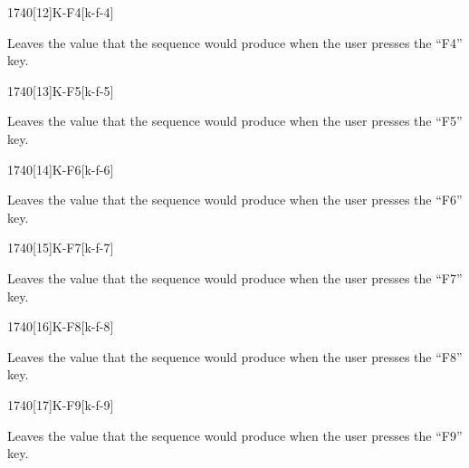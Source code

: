 \begin{worddef}{1740}[12]{K-F4}[k-f-4]%
\item {}

	Leaves the value  that the sequence 
	 would produce when the user presses the
	``F4'' key.

\end{worddef}


\begin{worddef}{1740}[13]{K-F5}[k-f-5]%
\item {}

	Leaves the value  that the sequence 
	 would produce when the user presses the
	``F5'' key.

\end{worddef}


\begin{worddef}{1740}[14]{K-F6}[k-f-6]%
\item {}

	Leaves the value  that the sequence 
	 would produce when the user presses the
	``F6'' key.

\end{worddef}


\begin{worddef}{1740}[15]{K-F7}[k-f-7]%
\item {}

	Leaves the value  that the sequence 
	 would produce when the user presses the
	``F7'' key.

\end{worddef}


\begin{worddef}{1740}[16]{K-F8}[k-f-8]%
\item {}

	Leaves the value  that the sequence 
	 would produce when the user presses the
	``F8'' key.

\end{worddef}


\begin{worddef}{1740}[17]{K-F9}[k-f-9]%
\item {}

	Leaves the value  that the sequence 
	 would produce when the user presses the
	``F9'' key.

\end{worddef}



